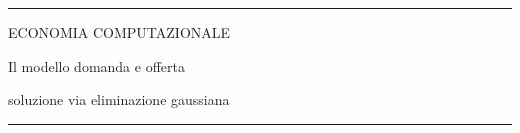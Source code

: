 \documentclass[12pt,aspectratio=169]{beamer}
\begin{document}
\begin{frame}
\begin{center}
\rule{\textwidth}{2pt}

\vskip3mm
ECONOMIA COMPUTAZIONALE

Il modello domanda e offerta

soluzione via eliminazione gaussiana
\rule{\textwidth}{2pt}
\end{center}

\end{frame}


\end{document}

